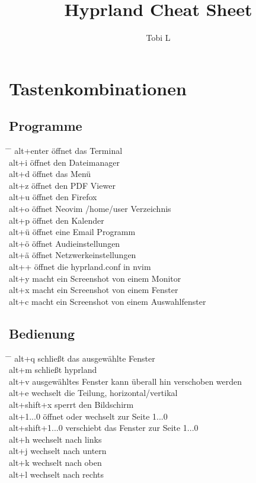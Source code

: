 \documentclass[10pt,a4paper,oneside]{article}
\author{Tobi L}
\title{Hyprland Cheat Sheet}
\begin{document}
\section*{Tastenkombinationen}
\subsection*{Programme}
\begin{tabbing}
  \hspace*{1mm} \=\hspace{30mm} \=\kill
  \> alt+enter \> öffnet das Terminal \\ 
  \> alt+i \> öffnet den Dateimanager \\ 
  \> alt+d \> öffnet das Menü \\ 
  \> alt+z \> öffnet den PDF Viewer \\ 
  \> alt+u \> öffnet den Firefox \\ 
  \> alt+o \> öffnet Neovim /home/user Verzeichnis \\ 
  \> alt+p \> öffnet den Kalender \\ 
  \> alt+ü \> öffnet eine Email Programm \\ 
  \> alt+ö \> öffnet Audieinstellungen \\ 
  \> alt+ä \> öffnet Netzwerkeinstellungen \\ 
  \> alt++ \> öffnet die hyprland.conf in nvim \\ 
  \> alt+y \> macht ein Screenshot von einem Monitor \\ 
  \> alt+x \> macht ein Screenshot von einem Fenster \\
  \> alt+c \> macht ein Screenshot von einem Auswahlfenster \\
\end{tabbing}
\subsection*{Bedienung}
\begin{tabbing}
  \hspace*{1mm} \=\hspace{30mm} \=\kill
  \> alt+q \> schließt das ausgewählte Fenster \\ 
  \> alt+m \> schließt hyprland \\ 
  \> alt+v \> ausgewähltes Fenster kann überall hin verschoben werden \\ 
  \> alt+e \> wechselt die Teilung, horizontal/vertikal \\ 
  \> alt+shift+x \> sperrt den Bildschirm \\ 
  \> alt+1...0 \> öffnet oder wechselt zur Seite 1...0 \\
  \> alt+shift+1...0 \> verschiebt das Fenster zur Seite 1...0 \\
  \> alt+h \> wechselt nach links \\ 
  \> alt+j \> wechselt nach untern \\ 
  \> alt+k \> wechselt nach oben \\ 
  \> alt+l \> wechselt nach rechts \\ 
\end{tabbing}
\end{document}
